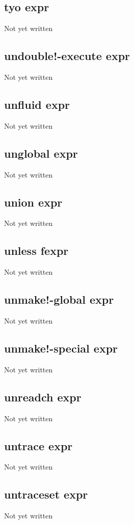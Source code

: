 \documentclass[a4paper,11pt]{article}
\begin{document}
{\subsection{\ttfamily tyo expr}
Not yet written

\subsection{\ttfamily undouble!-execute expr}
Not yet written

\subsection{\ttfamily unfluid expr}
Not yet written

\subsection{\ttfamily unglobal expr}
Not yet written

\subsection{\ttfamily union expr}
Not yet written

\subsection{\ttfamily unless fexpr}
Not yet written

\subsection{\ttfamily unmake!-global expr}
Not yet written

\subsection{\ttfamily unmake!-special expr}
Not yet written

\subsection{\ttfamily unreadch expr}
Not yet written

\subsection{\ttfamily untrace expr}
Not yet written

\subsection{\ttfamily untraceset expr}
Not yet written

}
\end{document}

